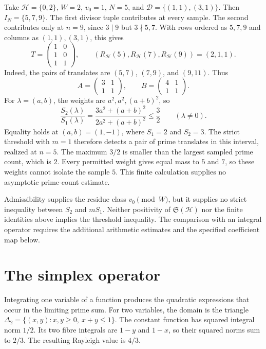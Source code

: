\documentclass[11pt]{article}
\begin{document}
\begin{example}
Take $\mathcal H=\{0,2\}$, $W=2$, $v_0=1$, $N=5$, and
$\mathcal D=\{(1,1),(3,1)\}$.  Then $I_N=\{5,7,9\}$.
The first divisor tuple contributes at every sample.  The second contributes
only at $n=9$, since $3\mid9$ but $3\nmid5,7$.  With rows ordered as
$5,7,9$ and columns as $(1,1),(3,1)$, this gives
\[
 T=\begin{pmatrix}1&0\\1&0\\1&1\end{pmatrix},
 \qquad
 (R_{\mathcal H}(5),R_{\mathcal H}(7),R_{\mathcal H}(9))=(2,1,1).
\]
Indeed, the pairs of translates are $(5,7)$, $(7,9)$, and $(9,11)$.
Thus
\[
 A=\begin{pmatrix}3&1\\1&1\end{pmatrix},\qquad
 B=\begin{pmatrix}4&1\\1&1\end{pmatrix}.
\]
For $\lambda=(a,b)$, the weights are $a^2,a^2,(a+b)^2$, so
\[
 \frac{S_2(\lambda)}{S_1(\lambda)}
 =\frac{3a^2+(a+b)^2}{2a^2+(a+b)^2}
 \leq\frac32\qquad(\lambda\ne0).
\]
Equality holds at $(a,b)=(1,-1)$, where $S_1=2$ and $S_2=3$.
The strict threshold with $m=1$ therefore detects a pair of prime translates
in this interval, realized at $n=5$.  The maximum $3/2$ is smaller than the
largest sampled prime count, which is $2$.  Every permitted weight gives
equal mass to $5$ and $7$, so these weights cannot isolate the sample $5$.
This finite calculation supplies no asymptotic prime-count estimate.
\end{example}

Admissibility supplies the residue class $v_0\pmod W$, but it supplies no strict inequality
between $S_2$ and $mS_1$.  Neither positivity of
$\mathfrak S(\mathcal H)$ nor the finite identities above implies the threshold
inequality.  The comparison with an integral operator requires the additional
arithmetic estimates and the specified coefficient map below.

\section{The simplex operator}

Integrating one variable of a function produces the quadratic expressions
that occur in the limiting prime sum.  For two variables, the domain is
the triangle $\Delta_2=\{(x,y):x,y\geq0,\ x+y\leq1\}$.  The constant
function has squared integral norm $1/2$.  Its two fibre integrals are
$1-y$ and $1-x$, so their squared norms sum to $2/3$.
The resulting Rayleigh value is $4/3$.
\end{document}
